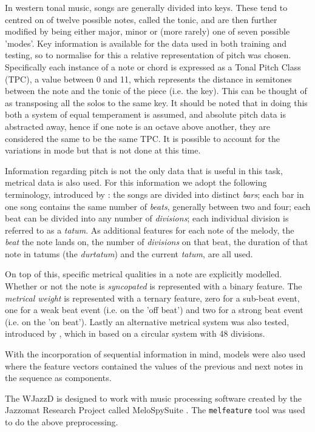 \documentclass[bsc,singlespacing,parskip,deptreport]{infthesis}
\begin{document}
In western tonal music, songs are generally divided into keys. These tend to centred on of twelve possible notes, called the tonic, and are then further modified by being either major, minor or (more rarely) one of seven possible 'modes'. Key information is available for the data used in both training and testing, so to normalise for this a relative representation of pitch was chosen. Specifically each instance of a note or chord is expressed as a Tonal Pitch Class (TPC), a value between 0 and 11, which represents the distance in semitones between the note and the tonic of the piece (i.e. the key). This can be thought of as transposing all the solos to the same key. It should be noted that in doing this both a system of equal temperament is assumed, and absolute pitch data is abstracted away, hence if one note is an octave above another, they are considered the same to be the same TPC. It is possible to account for the variations in mode \cite{mysong} but that is not done at this time.

Information regarding pitch is not the only data that is useful in this task, metrical data is also used. For this information we adopt the following terminology, introduced by \cite{mel}: the songs are divided into distinct \emph{bars}; each bar in one song contains the same number of \emph{beats}, generally between two and four; each beat can be divided into any number of \emph{divisions}; each individual division is referred to as a \emph{tatum}. As additional features for each note of the melody, the \emph{beat} the note lands on, the number of \emph{divisions} on that beat, the duration of that note in tatums (the \emph{durtatum}) and the current \emph{tatum}, are all used.

On top of this, specific metrical qualities in a note are explicitly modelled. Whether or not the note is \emph{syncopated} is represented with a binary feature. The \emph{metrical weight} is represented with a ternary feature, zero for a sub-beat event, one for a weak beat event (i.e. on the 'off beat') and two for a strong beat event (i.e. on the 'on beat'). Lastly an alternative metrical system was also tested, introduced by \cite{mcm48}, which in based on a circular system with 48 divisions.

With the incorporation of sequential information in mind, models were also used where the feature vectors contained the values of the previous and next notes in the sequence as components.

The WJazzD is designed to work with music processing software created by the Jazzomat Research Project called MeloSpySuite \cite{mel}. The {\tt melfeature} tool was used to do the above preprocessing.
\end{document}
